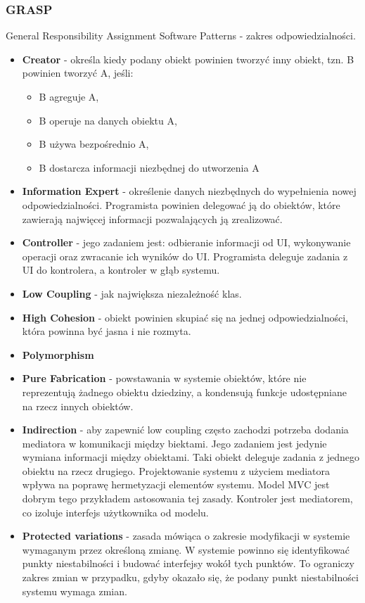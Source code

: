 \documentclass[../main.tex]{subfiles}
\begin{document}
    \subsubsection{GRASP}
    General Responsibility Assignment Software Patterns - zakres odpowiedzialności.
    \begin{itemize}
        \item \textbf{Creator} - określa kiedy podany obiekt powinien tworzyć inny obiekt, tzn. B powinien tworzyć A, jeśli:
        \begin{itemize}
            \item B agreguje A,
            \item B operuje na danych obiektu A,
            \item B używa bezpośrednio A,
            \item B dostarcza informacji niezbędnej do utworzenia A
        \end{itemize}
        \item \textbf{Information Expert} - określenie danych niezbędnych do wypełnienia nowej odpowiedzialności. Programista powinien delegować ją do obiektów, które
        zawierają najwięcej informacji pozwalających ją zrealizować.
        \item \textbf{Controller} - jego zadaniem jest: odbieranie informacji od UI, wykonywanie operacji oraz zwracanie ich wyników do UI.
        Programista deleguje zadania z UI do kontrolera, a kontroler w głąb systemu.
        \item \textbf{Low Coupling} - jak największa niezależność klas.
        \item \textbf{High Cohesion} - obiekt powinien skupiać się na jednej odpowiedzialności, która powinna być jasna i nie rozmyta.
        \item \textbf{Polymorphism}
        \item \textbf{Pure Fabrication} - powstawania w systemie obiektów, które nie reprezentują
        żadnego obiektu dziedziny, a kondensują funkcje udostępniane na rzecz innych obiektów.
        \item \textbf{Indirection} - aby zapewnić low coupling często zachodzi potrzeba
        dodania mediatora w komunikacji między biektami. Jego zadaniem jest jedynie wymiana informacji
        między obiektami. Taki obiekt deleguje zadania z jednego obiektu na rzecz drugiego. Projektowanie
        systemu z użyciem mediatora wpływa na poprawę hermetyzacji elementów systemu.
        Model MVC jest dobrym tego przykładem astosowania tej zasady. Kontroler jest mediatorem, co izoluje
        interfejs użytkownika od modelu.
        \item \textbf{Protected variations} - zasada mówiąca o zakresie modyfikacji w systemie
        wymaganym przez określoną zmianę. W systemie powinno się identyfikować punkty niestabilności i
        budować interfejsy wokół tych punktów. To ograniczy zakres zmian w przypadku, gdyby
        okazało się, że podany punkt niestabilności systemu wymaga zmian.
    \end{itemize}
\end{document}
